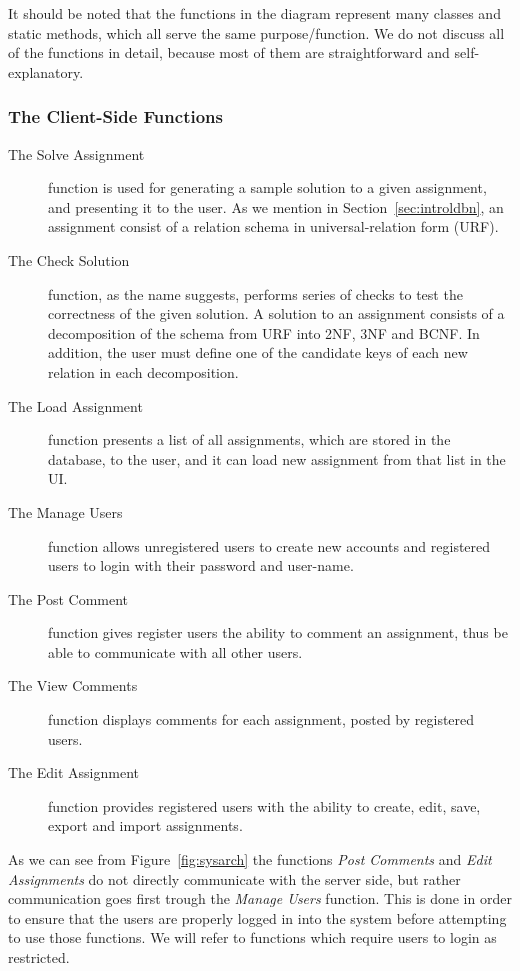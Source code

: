It should be noted that the functions in the diagram represent many classes and 
static methods, which all serve the same purpose/function. We do not 
discuss all 
of the functions in detail, because most of them are straightforward and 
self-explanatory. 

\subsubsection{The Client-Side Functions}

\begin{description}
	\item[The Solve Assignment] function is used for generating a sample solution to 
		a given assignment, and presenting it to the user. As we mention in 
		Section~\ref{sec:introldbn}, an assignment consist of a relation schema in universal-relation form (URF).
	\item[The Check Solution] function, as the name suggests, performs series of checks to 
		test the correctness of the given solution. A solution to an assignment consists 
		of a decomposition of the schema from URF into 2NF, 3NF and BCNF. In addition,
		the user must define one of the candidate keys  of each new relation in each
		decomposition. 
	\item[The Load Assignment] function presents a list of all assignments, which are 
		stored in the database, to the user, and it can load new assignment from that list
		in the UI.
	\item[The Manage Users] function allows unregistered users to create new accounts 
		and registered users to login with their password and user-name. 
	\item[The Post Comment] function gives register users the ability to comment an assignment, 
		thus be able to communicate with all other users.
	\item[The View Comments] function displays comments for each assignment, posted by registered users.
	\item[The Edit Assignment] function provides registered users with the 
		ability to create, edit, save, export and import assignments. 
\end{description}

As we can see from Figure~\ref{fig:sysarch} the functions \textit{Post Comments} 
and \textit{Edit Assignments} do not directly communicate with the server side, but rather 
communication goes first trough the \textit{Manage Users} function. This is done in order 
to ensure that the users are properly logged in into the system before attempting 
to use those functions. We will refer to functions which require users to login as restricted. 

